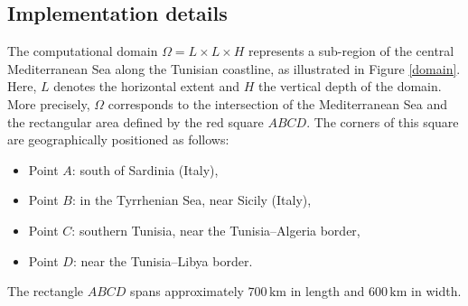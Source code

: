 \documentclass[a4paper,12pt,reqno,natbib]{amsart}
\begin{document}
\subsection{Implementation details}

The computational domain \( \Omega = L \times L \times H \) represents a sub-region of the central Mediterranean Sea along the Tunisian coastline, as illustrated in Figure \ref{domain}. Here, \( L \) denotes the horizontal extent and \( H \) the vertical depth of the domain. More precisely, \( \Omega \) corresponds to the intersection of the Mediterranean Sea and the rectangular area defined by the red square \( ABCD \). The corners of this square are geographically positioned as follows:
\begin{itemize}
    \item Point \( A \): south of Sardinia (Italy),
    \item Point \( B \): in the Tyrrhenian Sea, near Sicily (Italy),
    \item Point \( C \): southern Tunisia, near the Tunisia–Algeria border,
    \item Point \( D \): near the Tunisia–Libya border.
\end{itemize}
The rectangle \( ABCD \) spans approximately \( 700\,\mathrm{km} \) in length and \( 600\,\mathrm{km} \) in width.

\vspace{0.3cm}
\end{document}
